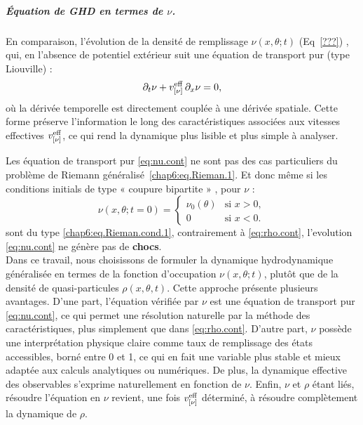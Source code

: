 \subparagraph{Équation de GHD en termes de $\nu$.}
En comparaison, l’évolution de la densité de remplissage $\nu(x,\theta;t)$ (Eq~\eqref{???}) , qui, en l’absence de potentiel extérieur suit une équation de transport pur (type Liouville) :
\begin{equation}
    \label{eq:nu.cont}
    \partial_t \nu + v^{\rm eff}_{[\nu]} \, \partial_x \nu = 0,
\end{equation}
où la dérivée temporelle est directement couplée à une dérivée spatiale. Cette forme préserve l'information le long des caractéristiques associées aux vitesses effectives $v^{\rm eff}_{[\nu]}$, ce qui rend la dynamique plus lisible et plus simple à analyser.

Les équation de transport pur \eqref{eq:nu.cont} ne sont pas  des cas particuliers du problème de Riemann généralisé~\eqref{chap6:eq.Rieman.1}. Et donc même si les conditions initials de type  « coupure bipartite » , pour $\nu$ :
\begin{equation}
    \label{eq:nu.cont.init}
    \nu(x,\theta;t=0) = 
    \begin{cases}
        \nu_0(\theta) & \text{si } x > 0, \\
        0 & \text{si } x < 0.
    \end{cases}
\end{equation}
sont du type \eqref{chap6:eq.Rieman.cond.1}, contrairement à \eqref{eq:rho.cont}, l'evolution \eqref{eq:nu.cont} ne génère pas de {\bf chocs}.\\


Dans ce travail, nous choisissons de formuler la dynamique hydrodynamique généralisée en termes de la fonction d’occupation $\nu(x,\theta;t)$, plutôt que de la densité de quasi-particules $\rho(x,\theta,t)$. Cette approche présente plusieurs avantages. D’une part, l’équation vérifiée par $\nu$ est une équation de transport pur \eqref{eq:nu.cont}, ce qui permet une résolution naturelle par la méthode des caractéristiques, plus simplement que dans \eqref{eq:rho.cont}. D’autre part, $\nu$ possède une interprétation physique claire comme taux de remplissage des états accessibles, borné entre 0 et 1, ce qui en fait une variable plus stable et mieux adaptée aux calculs analytiques ou numériques.
De plus, la dynamique effective des observables s’exprime naturellement en fonction de $\nu$.
Enfin, $\nu$ et $\rho$ étant liés, résoudre l’équation en $\nu$ revient, une fois $v^{\rm eff}_{[\nu]}$ déterminé, à résoudre complètement la dynamique de $\rho$.

